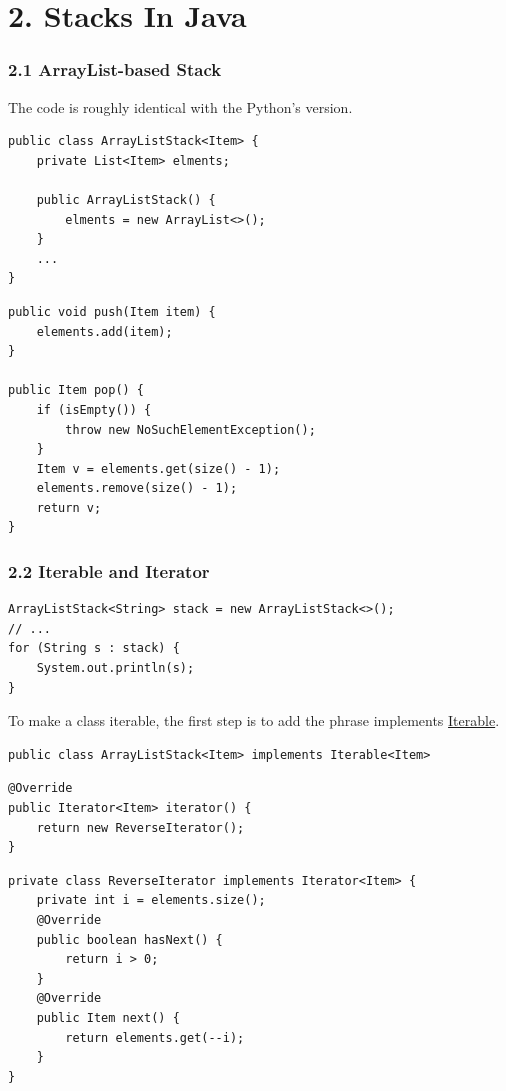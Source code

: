 \documentclass[aspectratio=169, 14pt]{beamer}
\begin{document}
\section{\textcolor{darkmidnightblue}{2. Stacks In Java}}

\begin{frame}[fragile]
    \frametitle{2.1 ArrayList-based Stack}
    The code is roughly identical with the Python's version.
    \begin{verbatim}
public class ArrayListStack<Item> {
    private List<Item> elments;

    public ArrayListStack() {
        elments = new ArrayList<>();
    }
    ...
}
    \end{verbatim}
\end{frame}

\begin{frame}[fragile]
    \begin{verbatim}
public void push(Item item) {
    elements.add(item);
}

public Item pop() {
    if (isEmpty()) {
        throw new NoSuchElementException();
    }
    Item v = elements.get(size() - 1);
    elements.remove(size() - 1);
    return v;
}
    \end{verbatim}
\end{frame}

\begin{frame}[fragile]
    \frametitle{2.2 Iterable and Iterator}
    \begin{verbatim}
ArrayListStack<String> stack = new ArrayListStack<>();
// ...
for (String s : stack) {
    System.out.println(s);
}    
    \end{verbatim}
To make a class iterable, the first step is to add the phrase implements \href{https://docs.oracle.com/en/java/javase/11/docs/api/java.base/java/lang/Iterable.html}{Iterable}.

\begin{verbatim}
public class ArrayListStack<Item> implements Iterable<Item>
\end{verbatim}
\end{frame}

\begin{frame}[fragile]

\begin{verbatim}
@Override
public Iterator<Item> iterator() {
    return new ReverseIterator();
}
\end{verbatim}

\begin{verbatim}
private class ReverseIterator implements Iterator<Item> {
    private int i = elements.size();
    @Override
    public boolean hasNext() {
        return i > 0;
    }
    @Override
    public Item next() {
        return elements.get(--i);
    }
}
\end{verbatim}
\end{frame}
\end{document}
